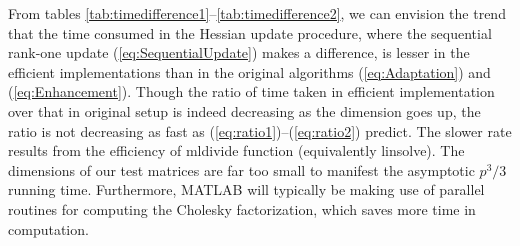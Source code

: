 \documentclass[conference,10.3cpt]{IEEEtran}
\begin{document}
\begin{table}[htbp]
	\centering
		\caption{Time Consumed in Hessian Update Procedure for Different Dimension  $p$
			}
		\label{tab:timedifference1}
	\end{table}
	
	\begin{table}[htbp]
		\centering
			\caption{Time Consumed in Hessian Update Procedure for Different Dimension  $p$
				}
			\label{tab:timedifference2}
		\end{table}

From tables \ref{tab:timedifference1}--\ref{tab:timedifference2}, we can envision the trend that the time consumed in the Hessian update procedure, where the sequential rank-one update (\ref{eq:SequentialUpdate}) makes a difference, is lesser in the efficient implementations than in the original algorithms (\ref{eq:Adaptation}) and (\ref{eq:Enhancement}). Though the ratio of time taken in efficient implementation over that in original setup is indeed decreasing as the dimension goes up, the ratio is not decreasing as fast as (\ref{eq:ratio1})--(\ref{eq:ratio2}) predict. The slower rate results from the efficiency of mldivide function (equivalently linsolve). The dimensions of our test matrices are far too small to manifest the asymptotic $p^3/3$ running time. Furthermore, MATLAB will typically be making use of parallel routines for computing the Cholesky factorization, which saves more time in computation. 
\end{document}
